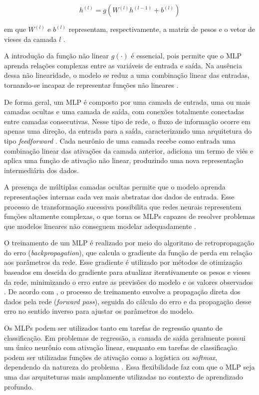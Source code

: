 \begin{equation}
h^{(l)} = g\!\left(W^{(l)}h^{(l-1)} + b^{(l)}\right)
\label{eq:mlp_camadas}
\end{equation}

em que $W^{(l)}$ e $b^{(l)}$ representam, respectivamente, a matriz de pesos 
e o vetor de vieses da camada $l$ \cite{Goodfellow2016}.

A introdução da função não linear $g(\cdot)$ é essencial, pois permite que 
o MLP aprenda relações complexas entre as variáveis de entrada e saída. Na ausência 
dessa não linearidade, o modelo se reduz a uma combinação linear das entradas, tornando-se 
incapaz de representar funções não lineares \cite{Goodfellow2016}.

De forma geral, um MLP é composto por uma camada de entrada, uma ou mais camadas ocultas e uma camada de saída, com conexões totalmente conectadas entre camadas consecutivas. 
Nesse tipo de rede, o fluxo de informação ocorre em apenas uma direção, da entrada para a saída, caracterizando uma arquitetura do tipo \textit{feedforward} \cite{Geron2019}. 
Cada neurônio de uma camada recebe como entrada uma combinação linear das ativações da camada anterior, adiciona um termo de viés e aplica uma função de ativação não linear, 
produzindo uma nova representação intermediária dos dados.

A presença de múltiplas camadas ocultas permite que o modelo aprenda representações internas cada vez mais abstratas dos dados de entrada. 
Esse processo de transformação sucessiva possibilita que redes neurais representem funções altamente complexas, o que torna os MLPs capazes de resolver 
problemas que modelos lineares não conseguem modelar adequadamente \cite{Goodfellow2016,Geron2019}.

O treinamento de um MLP é realizado por meio do algoritmo de retropropagação do erro (\textit{backpropagation}), que calcula o gradiente da função de perda 
em relação aos parâmetros da rede. Esse gradiente é utilizado por métodos de otimização baseados em descida do gradiente para atualizar iterativamente os pesos 
e vieses da rede, minimizando o erro entre as previsões do modelo e os valores observados \cite{Goodfellow2016}. 
De acordo com \cite{Geron2019}, o processo de treinamento envolve a propagação direta dos dados pela rede (\textit{forward pass}), seguida do cálculo do erro 
e da propagação desse erro no sentido inverso para ajustar os parâmetros do modelo.

Os MLPs podem ser utilizados tanto em tarefas de regressão quanto de classificação. Em problemas de regressão, a camada de saída geralmente possui um único neurônio 
com ativação linear, enquanto em tarefas de classificação podem ser utilizadas funções de ativação como a logística ou \textit{softmax}, dependendo da natureza do problema 
\cite{Geron2019}. Essa flexibilidade faz com que o MLP seja uma das arquiteturas mais amplamente utilizadas no contexto de aprendizado profundo.

